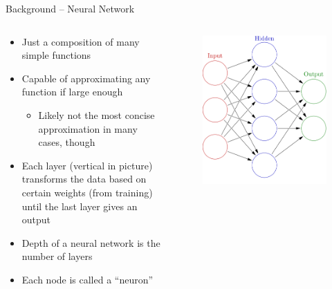 \documentclass{beamer}
\begin{document}
	\begin{frame}{Background -- Neural Network}
	\begin{columns}
	\begin{column}{0.6\textwidth}
	\begin{itemize}
		\item Just a composition of many simple functions
		\item Capable of approximating any function if large enough
		\begin{itemize}
			\item Likely not the most concise approximation in many cases, though
		\end{itemize}
		\item Each layer (vertical in picture) transforms the data based on certain weights (from training) until the last layer gives an output
		\item Depth of a neural network is the number of layers
		\item Each node is called a ``neuron''
	\end{itemize}
	\end{column}
	\begin{column}{0.4\textwidth}
	\begin{figure}
		\includegraphics[width=\textwidth]{neural_network}
	\end{figure}
	\end{column}
	\end{columns}
	\end{frame}
\end{document}

